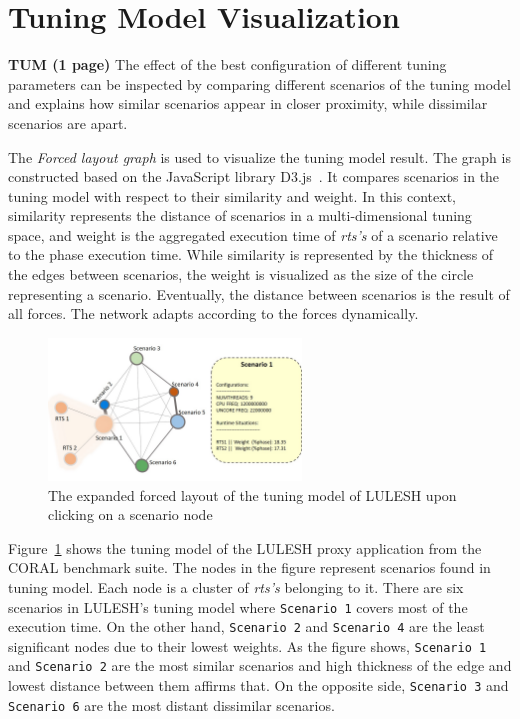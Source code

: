\section{Tuning Model Visualization} \label{sec:tm-visualization}
\textbf{TUM (1 page)}
The effect of the best configuration of different tuning parameters can be inspected by comparing different scenarios of the tuning model and explains how similar scenarios appear in closer proximity, while dissimilar scenarios are apart.

The \textit{Forced layout graph} is used to visualize the tuning model result. The graph is constructed based on the JavaScript library D3.js~\cite{bostock2011d3}. It compares scenarios in the tuning model with respect to their similarity and weight. In this context, similarity represents the distance of scenarios in a multi-dimensional tuning space, and weight is the aggregated execution time of \textit{rts's} of a scenario relative to the phase execution time. While similarity is represented by the thickness of the edges between scenarios, the weight is visualized as the size of the circle representing a scenario. Eventually, the distance between scenarios is the result of all forces. The network adapts according to the forces dynamically. 

\begin{figure}
	\begin{mdframed}
	\centering
		\includegraphics[width=0.60\textwidth]{figures/luleshTM_expand.jpg}
	\end{mdframed}
	\caption{\label{fig:forced-layout-expand}The expanded forced layout of the tuning model of LULESH upon clicking on a scenario node }
\end{figure}

Figure~\ref{fig:forced-layout-expand} shows the tuning model of the LULESH proxy application from the CORAL benchmark suite. The nodes in the figure represent scenarios found in tuning model. Each node is a cluster of \textit{rts's} belonging to it. There are six scenarios in LULESH's tuning model where \texttt{Scenario~1} covers most of the execution time. On the other hand, \texttt{Scenario~2} and \texttt{Scenario~4} are the least significant nodes due to their lowest weights. As the figure shows, \texttt{Scenario~1} and \texttt{Scenario~2} are the most similar scenarios and high thickness of the edge and lowest distance between them affirms that. On the opposite side, \texttt{Scenario~3} and \texttt{Scenario~6} are the most distant dissimilar scenarios.


